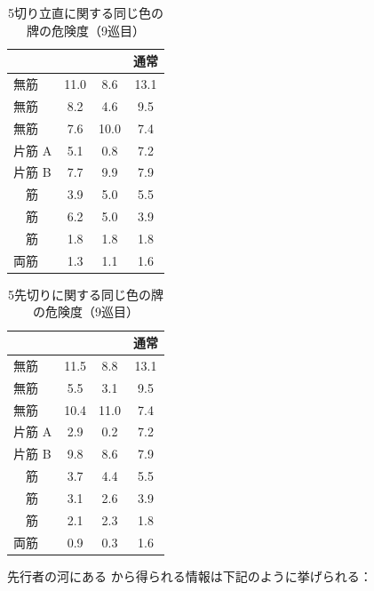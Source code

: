 \documentclass[../nankiru_main.tex]{subfiles}
\begin{document}
\begin{table}[ht]
  \centering
  \begin{tabular}{l|SSS}
     &  &  & 通常 \\
    \hline
    無筋    & 11.0 & 8.6 & 13.1 \\
    無筋    & 8.2  & 4.6 & 9.5 \\
    無筋    & 7.6  & 10.0 & 7.4 \\
    片筋  A & 5.1 & 0.8 & 7.2 \\
    片筋  B & 7.7 & 9.9 & 7.9 \\
    　筋    & 3.9 & 5.0 & 5.5 \\
    　筋    & 6.2 & 5.0 & 3.9 \\
    　筋    & 1.8 & 1.8 & 1.8 \\
    両筋    & 1.3 & 1.1 & 1.6
  \end{tabular}
  \caption{5切り立直に関する同じ色の牌の危険度（9巡目）\citep[][p. 162]{miinin-stat}}
  \label{tab:5rii}
\end{table}

\begin{table}[ht]
  \centering
  \begin{tabular}{l|SSS}
     &  &  & 通常 \\
    \hline
    無筋    & 11.5 & 8.8 & 13.1 \\
    無筋    & 5.5 & 3.1 & 9.5 \\
    無筋    & 10.4 & 11.0 & 7.4 \\
    片筋  A & 2.9 & 0.2 & 7.2 \\
    片筋  B & 9.8 & 8.6 & 7.9 \\
    　筋    & 3.7 & 4.4 & 5.5 \\
    　筋    & 3.1 & 2.6 & 3.9 \\
    　筋    & 2.1 & 2.3 & 1.8 \\
    両筋    & 0.9 & 0.3 & 1.6
  \end{tabular}
  \caption{5先切りに関する同じ色の牌の危険度（9巡目）\citep[][p. 162]{miinin-stat}}
  \label{tab:5saki}
\end{table}

先行者の河にある  から得られる情報は下記のように挙げられる：
\end{document}

